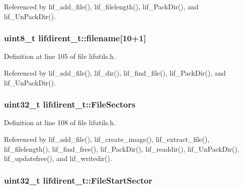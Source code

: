 Referenced by lif\+\_\+add\+\_\+file(), lif\+\_\+filelength(), lif\+\_\+\+Pack\+Dir(), and lif\+\_\+\+Un\+Pack\+Dir().

\subsubsection[{\texorpdfstring{filename}{filename}}]{\setlength{\rightskip}{0pt plus 5cm}uint8\+\_\+t lifdirent\+\_\+t\+::filename\mbox{[}10+1\mbox{]}}\hypertarget{structlifdirent__t_ac0d5353d2e81494997b15597377de032}{}\label{structlifdirent__t_ac0d5353d2e81494997b15597377de032}


Definition at line 105 of file lifutils.\+h.



Referenced by lif\+\_\+add\+\_\+file(), lif\+\_\+dir(), lif\+\_\+find\+\_\+file(), lif\+\_\+\+Pack\+Dir(), and lif\+\_\+\+Un\+Pack\+Dir().

\subsubsection[{\texorpdfstring{File\+Sectors}{FileSectors}}]{\setlength{\rightskip}{0pt plus 5cm}uint32\+\_\+t lifdirent\+\_\+t\+::\+File\+Sectors}\hypertarget{structlifdirent__t_a635a8963789282e49acda98839c7d9b3}{}\label{structlifdirent__t_a635a8963789282e49acda98839c7d9b3}


Definition at line 108 of file lifutils.\+h.



Referenced by lif\+\_\+add\+\_\+file(), lif\+\_\+create\+\_\+image(), lif\+\_\+extract\+\_\+file(), lif\+\_\+filelength(), lif\+\_\+find\+\_\+free(), lif\+\_\+\+Pack\+Dir(), lif\+\_\+readdir(), lif\+\_\+\+Un\+Pack\+Dir(), lif\+\_\+updatefree(), and lif\+\_\+writedir().

\subsubsection[{\texorpdfstring{File\+Start\+Sector}{FileStartSector}}]{\setlength{\rightskip}{0pt plus 5cm}uint32\+\_\+t lifdirent\+\_\+t\+::\+File\+Start\+Sector}\hypertarget{structlifdirent__t_a87df04d1aa76daa4b9500f2f2e44ecaa}{}\label{structlifdirent__t_a87df04d1aa76daa4b9500f2f2e44ecaa}


